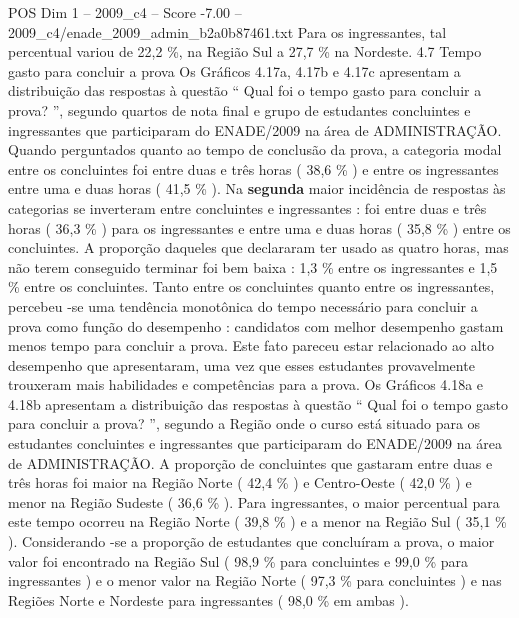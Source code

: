 \begin{textsample}{POS Dim 1 – 2009\_c4 – Score -7.00 – 2009\_c4/enade\_2009\_admin\_b2a0b87461.txt}
Para os ingressantes, tal percentual variou de 22,2 \%, na Região Sul a 27,7 \% na Nordeste. 4.7 Tempo gasto para concluir a prova Os Gráficos 4.17a, 4.17b e 4.17c apresentam a distribuição das respostas à questão “ Qual foi o tempo gasto para concluir a prova? ”, segundo quartos de nota final e grupo de estudantes concluintes e ingressantes que participaram do ENADE/2009 na área de ADMINISTRAÇÃO.
Quando perguntados quanto ao tempo de conclusão da prova, a categoria modal entre os concluintes foi entre duas e três horas ( 38,6 \% ) e entre os ingressantes entre uma e duas horas ( 41,5 \% ).
Na \textbf{segunda} maior incidência de respostas às categorias se inverteram entre concluintes e ingressantes : foi entre duas e três horas ( 36,3 \% ) para os ingressantes e entre uma e duas horas ( 35,8 \% ) entre os concluintes.
A proporção daqueles que declararam ter usado as quatro horas, mas não terem conseguido terminar foi bem baixa : 1,3 \% entre os ingressantes e 1,5 \% entre os concluintes.
Tanto entre os concluintes quanto entre os ingressantes, percebeu -se uma tendência monotônica do tempo necessário para concluir a prova como função do desempenho : candidatos com melhor desempenho gastam menos tempo para concluir a prova.
Este fato pareceu estar relacionado ao alto desempenho que apresentaram, uma vez que esses estudantes provavelmente trouxeram mais habilidades e competências para a prova.
Os Gráficos 4.18a e 4.18b apresentam a distribuição das respostas à questão “ Qual foi o tempo gasto para concluir a prova? ”, segundo a Região onde o curso está situado para os estudantes concluintes e ingressantes que participaram do ENADE/2009 na área de ADMINISTRAÇÃO.
A proporção de concluintes que gastaram entre duas e três horas foi maior na Região Norte ( 42,4 \% ) e Centro-Oeste ( 42,0 \% ) e menor na Região Sudeste ( 36,6 \% ).
Para ingressantes, o maior percentual para este tempo ocorreu na Região Norte ( 39,8 \% ) e a menor na Região Sul ( 35,1 \% ).
Considerando -se a proporção de estudantes que concluíram a prova, o maior valor foi encontrado na Região Sul ( 98,9 \% para concluintes e 99,0 \% para ingressantes ) e o menor valor na Região Norte ( 97,3 \% para concluintes ) e nas Regiões Norte e Nordeste para ingressantes ( 98,0 \% em ambas ).

\end{textsample}
